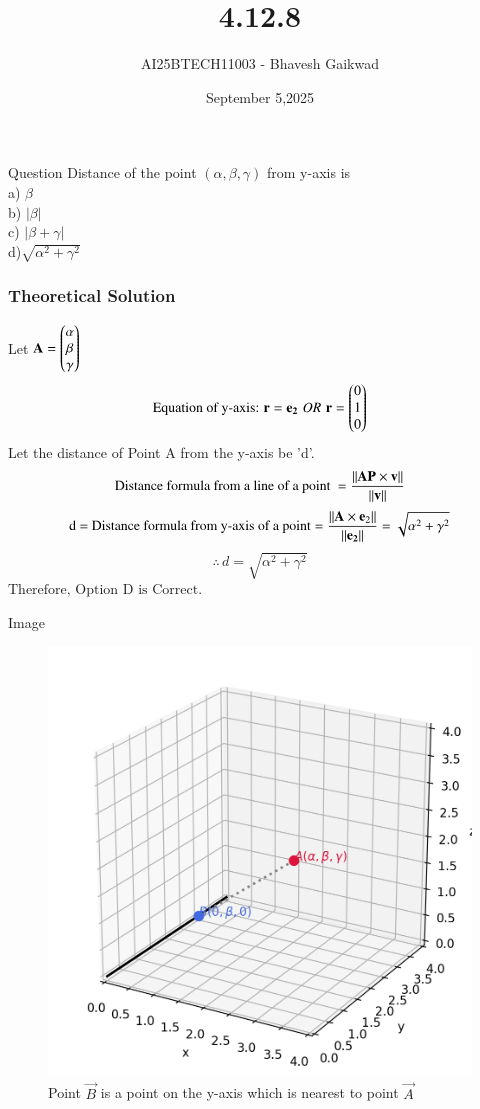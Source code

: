 \documentclass{beamer}
\title
{4.12.8}
\date{September 5,2025}
\author 
{AI25BTECH11003 - Bhavesh Gaikwad}
\begin{document}
\frame{\titlepage}
\begin{frame}{Question}
Distance of the point $(\alpha, \beta, \gamma)$ from y-axis is\\
a) $\beta$\\
b) $|\beta|$\\
c) $|\beta + \gamma|$\\
d)$\sqrt{\alpha^2 + \gamma^2}$ \\
\end{frame}


\begin{frame}[fragile]
    \frametitle{Theoretical Solution}
Let $\mathbf{A} = \begin{pmatrix}\alpha \\ \beta \\ \gamma\end{pmatrix}$
\begin{equation}
    \text{Equation of y-axis: } \mathbf{r} = \mathbf{e_2} \, \,
    OR \, \, \mathbf{r}=\begin{pmatrix}0 \\ 1 \\ 0\end{pmatrix}
\end{equation}
Let the distance of Point A from the y-axis be 'd'.
\begin{equation}
    \text{Distance formula from a line of a point } = \dfrac{\left\lVert\mathbf{AP}\times\mathbf{v}\right\rVert}{\left\lVert\mathbf{v}\right\rVert}
\end{equation}
\begin{equation}
    \text{d = Distance formula from y-axis of a point} = \dfrac{\left\lVert\mathbf{A}\times\mathbf{e}_2\right\rVert}{\left\lVert\mathbf{e_2}\right\rVert}=\sqrt{\alpha^2 + \gamma^2} 
\end{equation}
\begin{equation}
\therefore \, d = \sqrt{\alpha^2 + \gamma^2}    
\end{equation}
$\boxed{\text{Therefore, Option D is Correct.}}$

\end{frame}

\begin{frame}{Image}
\begin{figure}
   \centering
    \includegraphics[width=\columnwidth, height=0.7\textheight, keepaspectratio]{figs/fig1.png}
    \caption{Point $\vec{B}$ is a point on the y-axis which is nearest to point $\vec{A}$}
    \label{fig:Beamer/figs/fig1.png}
\end{figure}
\end{frame}
\end{document}
